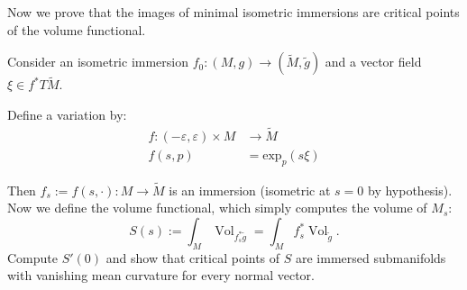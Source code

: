 \documentclass{book}
\begin{document}
\medskip\noindent

Now we prove that the images of minimal
isometric immersions are critical points
of the volume functional.

\begin{exercise}
\label{exercise-minim-isome-immer-criti}
Consider an isometric immersion $f_0:(M,g)
\to(\tilde{M},\tilde{g})$ and a
vector field $\xi \in f^*T\tilde{M}$.

Define a variation by:
$$
\begin{aligned}
f: (-\varepsilon,\varepsilon)\times M
&\longrightarrow \tilde{M} \\
f(s,p) &=\text{exp}_{p}(s \xi)
\end{aligned}
$$

Then $f_s:=f(s,\cdot):M \longrightarrow
\tilde{M}$ is an immersion (isometric at
$s=0$ by hypothesis). Now we define the
volume functional, which simply
computes the volume of $M_s$:
$$
S(s):= \int_{M}\operatorname{Vol}_{f_s
^*\tilde{g}}
=\int_M f_s^*\operatorname{Vol}_{\tilde{g}}.
$$
Compute $S'(0)$ and show that critical points
of $S$ are immersed submanifolds with
vanishing mean curvature for every normal
vector.
\end{exercise}
\end{document}
